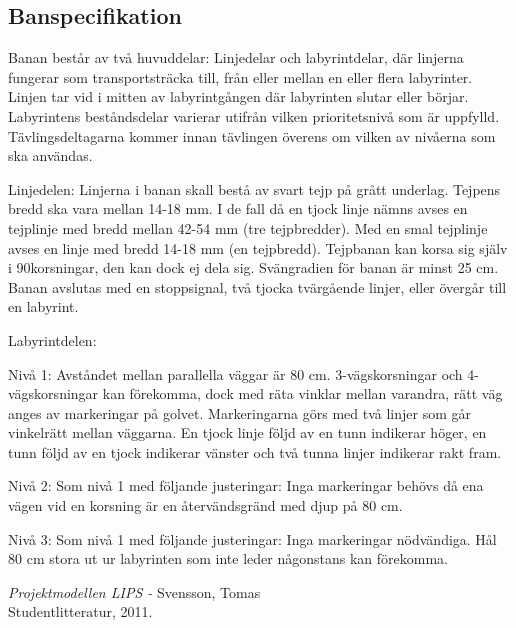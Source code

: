 \documentclass[a4paper,12pt]{article}
\begin{document}


\subsection{Banspecifikation} \label{app:bana}


Banan består av två huvuddelar: Linjedelar och labyrintdelar, där linjerna fungerar som transportsträcka till, från eller mellan en eller flera labyrinter. Linjen tar vid i mitten av labyrintgången där labyrinten slutar eller börjar. Labyrintens beståndsdelar varierar utifrån vilken prioritetsnivå som är uppfylld. Tävlingsdeltagarna kommer innan tävlingen överens om vilken av nivåerna som ska användas.

Linjedelen:
Linjerna i banan skall bestå av svart tejp på grått underlag. Tejpens bredd ska vara mellan 14-18 mm. I de fall då en tjock linje nämns avses en tejplinje med bredd mellan 42-54 mm (tre tejpbredder). Med en smal tejplinje avses en linje med bredd 14-18 mm (en tejpbredd). Tejpbanan kan korsa sig själv i 90\degree korsningar, den kan dock ej dela sig. Svängradien för banan är minst 25 cm. Banan avslutas med en stoppsignal, två tjocka tvärgående linjer, eller övergår till en labyrint.


Labyrintdelen:

\begin{list}{*}{}
\item Nivå 1: Avståndet mellan parallella väggar är 80 cm. 3-vägskorsningar och 4-vägskorsningar kan förekomma, dock med räta vinklar mellan varandra, rätt väg anges av markeringar på golvet. Markeringarna görs med två linjer som går vinkelrätt mellan väggarna. En tjock linje följd av en tunn indikerar höger, en tunn följd av en tjock indikerar vänster och två tunna linjer indikerar rakt fram. 
\item Nivå 2: Som nivå 1 med följande justeringar: Inga markeringar behövs då ena vägen vid en korsning är en återvändsgränd med djup på 80 cm.
\item Nivå 3: Som nivå 1 med följande justeringar: Inga markeringar nödvändiga. Hål 80 cm stora ut ur labyrinten som inte leder någonstans kan förekomma.
\end{list} 

\newpage


\begin{thebibliography}{99}
\textit{Projektmodellen LIPS - } Svensson, Tomas
\\Studentlitteratur, 2011.
\end{thebibliography}
\end{document}
